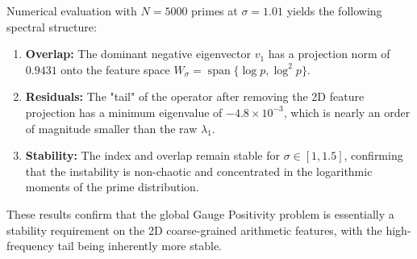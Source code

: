 \documentclass[12pt,a4paper]{article}
\theoremstyle{definition}
\theoremstyle{remark}
\begin{document}
Numerical evaluation with $N=5000$ primes at $\sigma=1.01$ yields the following spectral structure:
\begin{enumerate}
    \item \textbf{Overlap:} The dominant negative eigenvector $v_1$ has a projection norm of $0.9431$ onto the feature space $W_\sigma = \operatorname{span}\{\log p, \log^2 p\}$.
    \item \textbf{Residuals:} The "tail" of the operator after removing the 2D feature projection has a minimum eigenvalue of $-4.8 \times 10^{-3}$, which is nearly an order of magnitude smaller than the raw $\lambda_1$.
    \item \textbf{Stability:} The index and overlap remain stable for $\sigma \in [1, 1.5]$, confirming that the instability is non-chaotic and concentrated in the logarithmic moments of the prime distribution.
\end{enumerate}

These results confirm that the global Gauge Positivity problem is essentially a stability requirement on the 2D coarse-grained arithmetic features, with the high-frequency tail being inherently more stable.



\end{document}
